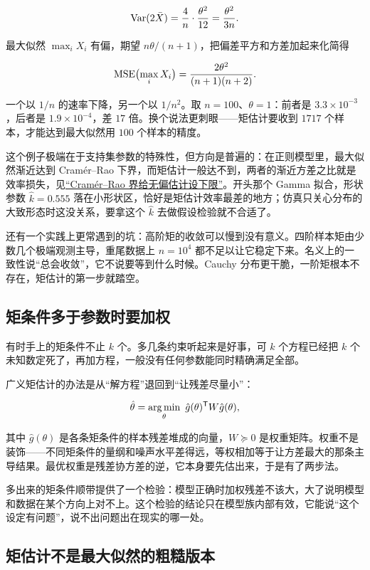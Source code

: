 \[
\operatorname{Var}(2\bar X)=\frac{4}{n}\cdot\frac{\theta^2}{12}=\frac{\theta^2}{3n} .
\]

最大似然 \(\max_i X_i\) 有偏，期望 \(n\theta/(n+1)\)，把偏差平方和方差加起来化简得

\[
\operatorname{MSE}\bigl(\max_i X_i\bigr)=\frac{2\theta^2}{(n+1)(n+2)} .
\]

一个以 \(1/n\) 的速率下降，另一个以 \(1/n^2\)。取 \(n=100\)、\(\theta=1\)：前者是 \(3.3\times 10^{-3}\)，后者是 \(1.9\times 10^{-4}\)，差 \(17\) 倍。换个说法更刺眼——矩估计要收到 \(1717\) 个样本，才能达到最大似然用 \(100\) 个样本的精度。

这个例子极端在于支持集参数的特殊性，但方向是普遍的：在正则模型里，最大似然渐近达到 Cramér--Rao 下界，而矩估计一般达不到，两者的渐近方差之比就是效率损失，见\hyperref[sec:11-Mathematical-Statistics/03-Sufficient-Statistics-and-Information/03]{``Cramér--Rao 界给无偏估计设下限''}。开头那个 Gamma 拟合，形状参数 \(\hat k=0.555\) 落在小形状区，恰好是矩估计效率最差的地方；仿真只关心分布的大致形态时这没关系，要拿这个 \(\hat k\) 去做假设检验就不合适了。

还有一个实践上更常遇到的坑：高阶矩的收敛可以慢到没有意义。四阶样本矩由少数几个极端观测主导，重尾数据上 \(n=10^4\) 都不足以让它稳定下来。名义上的一致性说``总会收敛''，它不说要等到什么时候。Cauchy 分布更干脆，一阶矩根本不存在，矩估计的第一步就踏空。

\subsection{矩条件多于参数时要加权}

有时手上的矩条件不止 \(k\) 个。多几条约束听起来是好事，可 \(k\) 个方程已经把 \(k\) 个未知数定死了，再加方程，一般没有任何参数能同时精确满足全部。

广义矩估计的办法是从``解方程''退回到``让残差尽量小''：

\[
\hat\theta=\operatorname*{arg\,min}_\theta\ \hat g(\theta)^{\mathsf{T}}W\hat g(\theta),
\]

其中 \(\hat g(\theta)\) 是各条矩条件的样本残差堆成的向量，\(W\succeq 0\) 是权重矩阵。权重不是装饰——不同矩条件的量纲和噪声水平差得远，等权相加等于让方差最大的那条主导结果。最优权重是残差协方差的逆，它本身要先估出来，于是有了两步法。

多出来的矩条件顺带提供了一个检验：模型正确时加权残差不该大，大了说明模型和数据在某个方向上对不上。这个检验的结论只在模型族内部有效，它能说``这个设定有问题''，说不出问题出在现实的哪一处。

\subsection{矩估计不是最大似然的粗糙版本}

